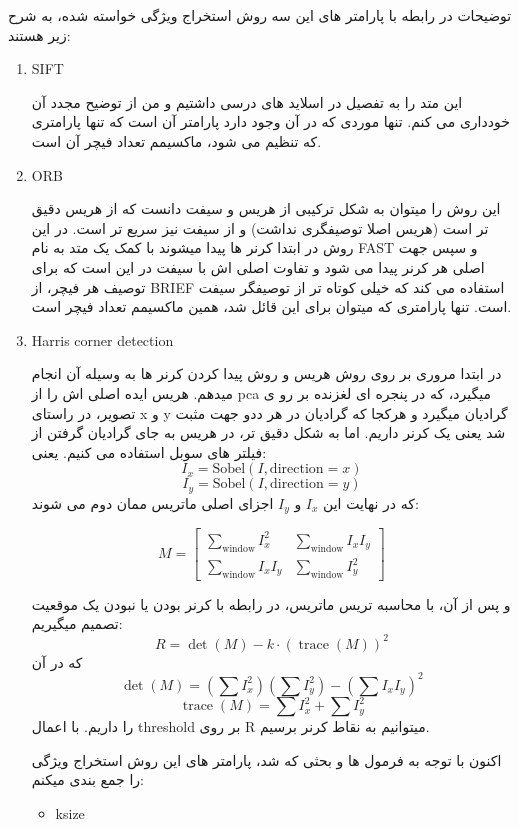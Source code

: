 \documentclass[a4paper,12pt]{article}
\begin{document}
توضیحات در رابطه با پارامتر های این سه روش استخراج ویژگی خواسته شده، به شرح زیر هستند:
\begin{enumerate}
	\item SIFT
	
	این متد را به تفصیل در اسلاید های درسی داشتیم و من از توضیح مجدد آن خودداری می کنم. تنها موردی که در آن وجود دارد پارامتر آن است که تنها پارامتری که تنظیم می شود، ماکسیمم تعداد فیچر آن است.
	
	\item ORB
	
	این روش را میتوان به شکل ترکیبی از هریس و سیفت دانست که از هریس دقیق تر است (هریس اصلا توصیفگری نداشت) و از سیفت نیز سریع تر است. در این روش در ابتدا کرنر ها پیدا میشوند با کمک یک متد به نام FAST و سپس جهت اصلی هر کرنر پیدا می شود و تفاوت اصلی اش با سیفت در این است که برای توصیف هر فیچر، از BRIEF استفاده می کند که خیلی کوتاه تر از توصیفگر سیفت است. 
	تنها پارامتری که میتوان برای این قائل شد، همین ماکسیمم تعداد فیچر است.
	
	\item Harris corner detection
	
	در ابتدا مروری بر روی روش هریس و روش پیدا کردن کرنر ها به وسیله آن انجام میدهم. هریس ایده اصلی اش را از pca میگیرد، که در پنجره ای لغزنده بر رو ی تصویر، 	در راستای x و y گرادیان میگیرد و هرکجا که گرادیان در هر ددو جهت مثبت شد یعنی یک کرنر داریم. اما به شکل دقیق تر، در هریس به جای گرادیان گرفتن از فیلتر های سوبل استفاده می کنیم. یعنی:
	\[
	I_x = \text{Sobel}(I, \text{direction} = x)
	\]
	\[
	I_y = \text{Sobel}(I, \text{direction} = y)
	\]
	که در نهایت این $I_x$ و $I_y$ اجزای اصلی ماتریس ممان دوم می شوند:
	
	\[
	M =
	\begin{bmatrix}
		\sum_{\text{window}} I_x^2 & \sum_{\text{window}} I_x I_y \\
		\sum_{\text{window}} I_x I_y & \sum_{\text{window}} I_y^2
	\end{bmatrix}
	\]
	
	و پس از آن، با محاسبه تریس ماتریس، در رابطه با کرنر بودن یا نبودن یک موقعیت تصمیم میگیریم:
	\[
	R = \det(M) - k \cdot (\operatorname{trace}(M))^2
	\]
	که در آن
	\[
	\det(M) = (\sum I_x^2)(\sum I_y^2) - (\sum I_x I_y)^2
	\]
	\[
	\operatorname{trace}(M) = \sum I_x^2 + \sum I_y^2
	\]
	را داریم. با اعمال threshold بر روی R میتوانیم به نقاط کرنر برسیم.
	
	اکنون با توجه به فرمول ها و بحثی که شد، پارامتر های این روش استخراج ویژگی را جمع بندی میکنم:
	\begin{itemize}
		\item ksize
		

\end{itemize}
\end{enumerate}
\end{document}
